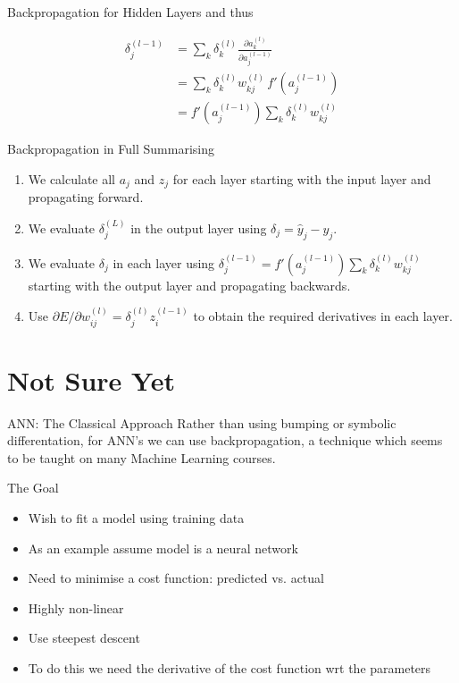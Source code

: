 \documentclass{beamer}
\begin{document}
\begin{frame}[fragile]{Backpropagation for Hidden Layers}
and thus

$$
\begin{aligned}
\delta_j^{(l-1)} &=
\sum_k \delta_k^{(l)}\frac{\partial
  a_k^{(l)}}{\partial a_j^{(l-1)}} \\
&= \sum_k \delta_k^{(l)} w_{kj}^{(l)}\, f'(a_j^{(l-1)}) \\
&= f'(a_j^{(l-1)}) \sum_k \delta_k^{(l)} w_{kj}^{(l)}
\end{aligned}
$$
\end{frame}

\begin{frame}[fragile]{Backpropagation in Full}
Summarising

\begin{enumerate}
\item
We calculate all $a_j$ and $z_j$ for each layer starting with the
input layer and propagating forward.
\item
We evaluate $\delta_j^{(L)}$ in the output layer using $\delta_j = \hat{y}_j - y_j$.
\item
We evaluate $\delta_j$ in each layer using $\delta_j^{(l-1)} =
f'(a_j^{(l-1)})\sum_k \delta_k^{(l)} w_{kj}^{(l)}$ starting with the output
layer and propagating backwards.
\item
Use $\partial E / \partial w_{ij}^{(l)} = \delta_j^{(l)} z_i^{(l-1)}$ to obtain the
required derivatives in each layer.
\end{enumerate}
\end{frame}

\section{Not Sure Yet}

\begin{frame}[fragile]{ANN: The Classical Approach}
Rather than using bumping or symbolic differentation, for ANN's we can
use backpropagation, a technique which seems to be taught on many
Machine Learning courses.
\end{frame}

\begin{frame}{The Goal}

  \begin{itemize}
  \item Wish to fit a model using training data
  \item As an example assume model is a neural network
  \item Need to minimise a cost function: predicted vs. actual
  \item Highly non-linear
  \item Use steepest descent
  \item To do this we need the derivative of the cost function wrt the
    parameters
\end{itemize}

\end{frame}
\end{document}
